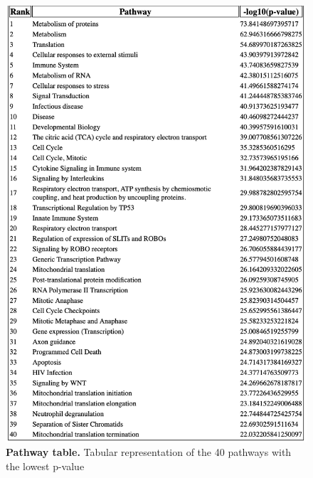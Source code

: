 \documentclass[11pt]{article}
\begin{document}
\begin{figure}[htp]
\begin{center}
\includegraphics[width=0.96\linewidth,clip]{./img/table.png}
\caption{\label{fig:table} {\bf Pathway table.} Tabular representation of the 40 pathways with the lowest p-value}
\end{center}
\end{figure}
\end{document}
